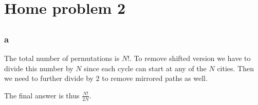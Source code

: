 \documentclass{article}
\begin{document}
\section*{Home problem 2}

\setcounter{section}{2}
\subsection{}
\subsubsection*{a}

The total number of permutations is $N!$. To remove shifted version we have to
divide this number by $N$ since each cycle can start at any of the $N$ cities.
Then we need to further divide by $2$ to remove mirrored paths as well.

The final answer is thus $\frac{N!}{2N}$.
\end{document}
